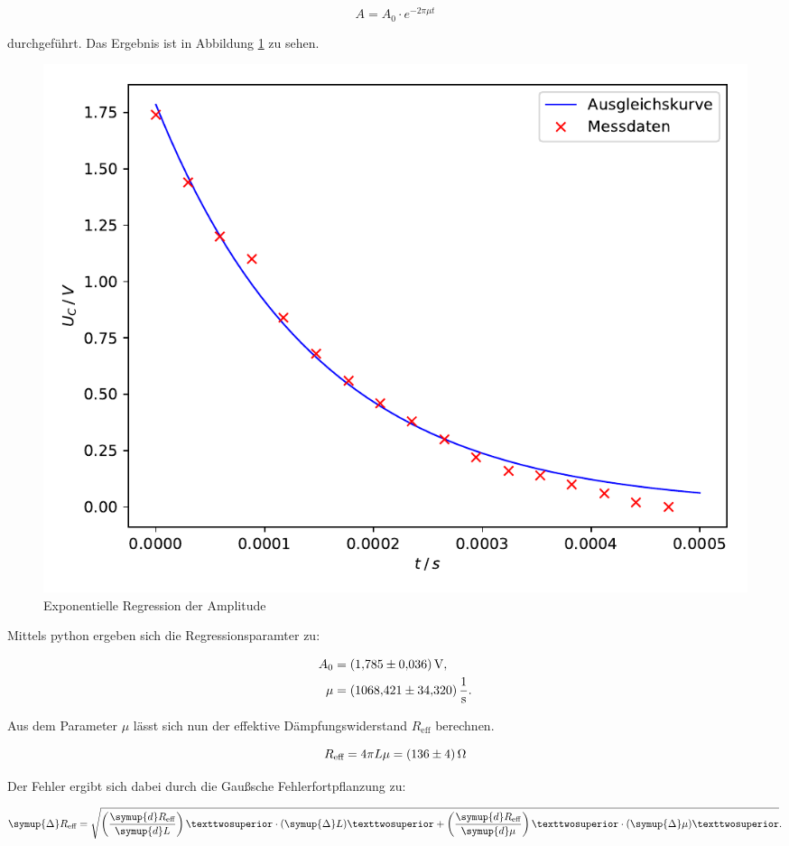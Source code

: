 \begin{equation*}
A = A_0 \cdot e^{-2\pi\mu t}
\end{equation*}

durchgeführt. Das Ergebnis ist in Abbildung \ref{fig:gedämpft} zu sehen. 

\begin{figure}
  \centering
  \includegraphics[scale=0.8]{content/plot1.pdf}
  \caption{Exponentielle Regression der Amplitude}
  \label{fig:gedämpft}
\end{figure}

Mittels python ergeben sich die Regressionsparamter zu: 

\begin{align*}
A_0 &= \SI{1.785+-0.036}{\volt},\\
\mu &= \SI{1068.421+-34.320}{\per\second}.
\end{align*}

Aus dem Parameter $\mu$ lässt sich nun der effektive Dämpfungswiderstand
$R_\text{eff}$ berechnen.

\begin{equation*}
R_\text{eff} = 4\pi L\mu = \SI{136+-4}{\ohm}
\end{equation*}

Der Fehler ergibt sich dabei durch die Gaußsche Fehlerfortpflanzung zu: 

\begin{equation*}
\symup{\Delta} R_\text{eff} = \sqrt{\left(\frac{\symup{d}R_\text{eff}}{\symup{d}L}\right)²\cdot (\symup{\Delta}L)² +
\left(\frac{\symup{d}R_\text{eff}}{\symup{d}\mu}\right)²\cdot (\symup{\Delta}\mu)²}.
\end{equation*}

